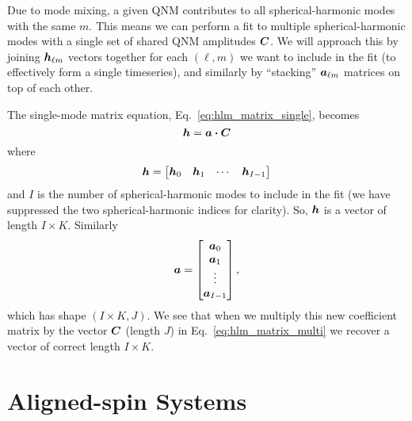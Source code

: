Due to mode mixing, a given QNM contributes to all spherical-harmonic modes with the same $m$. 
This means we can perform a fit to multiple spherical-harmonic modes with a single set of shared QNM amplitudes $\vb*{C}$.
We will approach this by joining $\vb*{h}_{\ell m}$ vectors together for each $(\ell, m)$ we want to include in the fit (to effectively form a single timeseries), and similarly by ``stacking'' $\vb*{a}_{\ell m}$ matrices on top of each other.


The single-mode matrix equation, Eq.~\ref{eq:hlm_matrix_single}, becomes
\begin{equation}\label{eq:hlm_matrix_multi}
    \vb*{h} = \vb*{a} \vdot \vb*{C}
\end{equation}
where
\begin{equation}
    \vb*{h} = 
    \begin{bmatrix}
    \vb*{h}_0 & \vb*{h}_1 & \cdots & \vb*{h}_{I-1}
    \end{bmatrix}
\end{equation}
and $I$ is the number of spherical-harmonic modes to include in the fit (we have suppressed the two spherical-harmonic indices for clarity). So, $\vb*{h}$ is a vector of length $I \times K$.
Similarly
\begin{equation}
    \vb*{a} = 
    \begin{bmatrix}
    \vb*{a}_0 \\ \vb*{a}_1 \\ \vdots \\ \vb*{a}_{I-1}
    \end{bmatrix},
\end{equation}
which has shape $(I \times K, J)$. 
We see that when we multiply this new coefficient matrix by the vector $\vb*{C}$ (length $J$) in Eq.~\ref{eq:hlm_matrix_multi} we recover a vector of correct length $I \times K$.

\section{Aligned-spin Systems}\label{aligned-spin-section}



